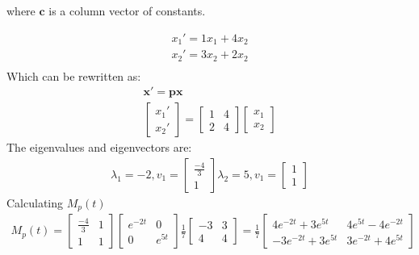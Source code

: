 where \(\bm{c}\) is a column vector of constants.
\begin{example}
   \begin{gather*}
      x_1' = 1 x_1 + 4 x_2 \\
      x_2' = 3x_2 + 2 x_2 \\
   \end{gather*}
   Which can be rewritten as:
   \begin{gather*}
      \bm{x'} = \bm{p} \bm{x} \\
      \begin{bmatrix}
         x_1' \\ x_2'
      \end{bmatrix} = \begin{bmatrix}
         1 & 4 \\ 2 & 4
      \end{bmatrix} \begin{bmatrix}
         x_1 \\ x_2
      \end{bmatrix}
   \end{gather*}
   The eigenvalues and eigenvectors are:
   \begin{gather*}
      \lambda_1 = -2, v_1 = \begin{bmatrix}
         \frac{-4}{3} \\ 1
      \end{bmatrix}
      \lambda_2 = 5, v_1 = \begin{bmatrix}
         1 \\ 1
      \end{bmatrix}
   \end{gather*}
   Calculating \(M_p(t)\)
   \begin{gather*}
      M_p(t) = \begin{bmatrix}
         \frac{-4}{3} & 1 \\ 1 & 1
      \end{bmatrix}
      \begin{bmatrix}
         e^{-2t} & 0 \\ 0 & e^{5t}
      \end{bmatrix} \frac{1}{7}\begin{bmatrix}
         -3 & 3 \\ 4 & 4
      \end{bmatrix} = \frac{1}{7 }\begin{bmatrix}
         4 e^{-2t} + 3e^{5t}  & 4e^{5t} - 4e^{-2t}   \\
         -3 e^{-2t} + 3e^{5t} & 3 e^{-2t} + 4 e^{5t}
      \end{bmatrix}

\end{gather*}
\end{example}

